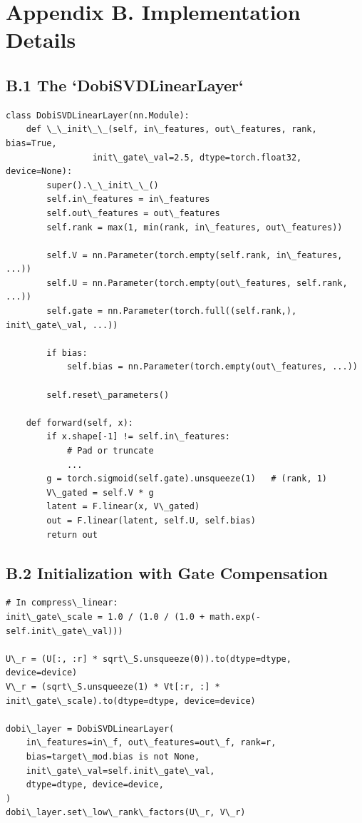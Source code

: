 
\section{Appendix B. Implementation Details}

\subsection{B.1 The `DobiSVDLinearLayer`}

\begin{lstlisting}
class DobiSVDLinearLayer(nn.Module):
    def \_\_init\_\_(self, in\_features, out\_features, rank, bias=True,
                 init\_gate\_val=2.5, dtype=torch.float32, device=None):
        super().\_\_init\_\_()
        self.in\_features = in\_features
        self.out\_features = out\_features
        self.rank = max(1, min(rank, in\_features, out\_features))
        
        self.V = nn.Parameter(torch.empty(self.rank, in\_features, ...))
        self.U = nn.Parameter(torch.empty(out\_features, self.rank, ...))
        self.gate = nn.Parameter(torch.full((self.rank,), init\_gate\_val, ...))
        
        if bias:
            self.bias = nn.Parameter(torch.empty(out\_features, ...))
        
        self.reset\_parameters()
    
    def forward(self, x):
        if x.shape[-1] != self.in\_features:
            # Pad or truncate
            ...
        g = torch.sigmoid(self.gate).unsqueeze(1)   # (rank, 1)
        V\_gated = self.V * g
        latent = F.linear(x, V\_gated)
        out = F.linear(latent, self.U, self.bias)
        return out
\end{lstlisting}

\subsection{B.2 Initialization with Gate Compensation}

\begin{lstlisting}
# In compress\_linear:
init\_gate\_scale = 1.0 / (1.0 / (1.0 + math.exp(-self.init\_gate\_val)))

U\_r = (U[:, :r] * sqrt\_S.unsqueeze(0)).to(dtype=dtype, device=device)
V\_r = (sqrt\_S.unsqueeze(1) * Vt[:r, :] * init\_gate\_scale).to(dtype=dtype, device=device)

dobi\_layer = DobiSVDLinearLayer(
    in\_features=in\_f, out\_features=out\_f, rank=r,
    bias=target\_mod.bias is not None,
    init\_gate\_val=self.init\_gate\_val,
    dtype=dtype, device=device,
)
dobi\_layer.set\_low\_rank\_factors(U\_r, V\_r)
\end{lstlisting}


